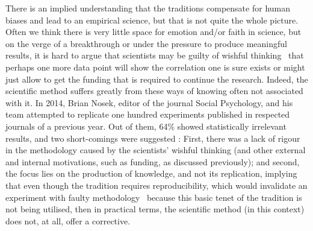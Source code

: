 \documentclass[12pt,a4paper]{article}
\begin{document}
There is an implied understanding that the traditions compensate for human biases and lead to an empirical science, but that is not quite the whole picture. Often we think there is very little space for emotion and/or faith in science, but on the verge of a breakthrough or under the pressure to produce meaningful results, it is hard to argue that scientists may be guilty of wishful thinking \citep{PlanetMoney677} \textendash\ that perhaps one more data point will show the correlation one is sure exists or might just allow to get the funding that is required to continue the research. Indeed, the scientific method suffers greatly from these ways of knowing often not associated with it. In 2014, Brian Nosek, editor of the journal Social Psychology, and his team attempted to replicate one hundred experiments published in respected journals of a previous year. Out of them, 64\% showed statistically irrelevant results, and two short-comings were suggested \citep{PlanetMoney677}: First, there was a lack of rigour in the methodology caused by the scientists' wishful thinking (and other external and internal motivations, such as funding, as discussed previously); and second, the focus lies on the production of knowledge, and not its replication, implying that even though the tradition requires reproducibility, which would invalidate an experiment with faulty methodology \textendash\ because this basic tenet of the tradition is not being utilised, then in practical terms, the scientific method (in this context) does not, at all, offer a corrective.
\end{document}
